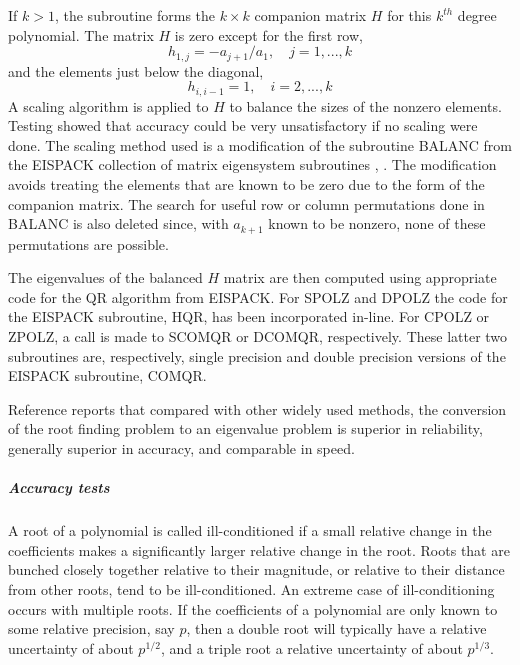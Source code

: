 \documentclass[twoside]{MATH77}
\begin{document}
If  $k>1$, the subroutine forms the $k\times k$ companion matrix $H$ for
this $k^{th}$ degree polynomial. The matrix $H$ is zero except for the first
row,%
\begin{equation*}
h_{1,j}=-a_{j+1}/a_1,\quad j=1, ..., k
\end{equation*}
and the elements just below the diagonal,%
\begin{equation*}
h_{i,i-1}=1,\quad i=2, ..., k
\end{equation*}
A scaling algorithm is applied to $H$ to balance the sizes of the nonzero
elements.  Testing showed that accuracy could be very unsatisfactory if no
scaling were done.  The scaling method used is a modification of the
subroutine BALANC from the EISPACK collection of matrix eigensystem
subroutines \cite{Smith:1974:MER}, \cite{Garbow:1977:MER}.  The
modification avoids treating the elements that are known to be zero due to
the form of the companion matrix.  The search for useful row or column
permutations done in BALANC is also deleted since, with $a_{k+1}$ known to
be nonzero, none of these permutations are possible.

The eigenvalues of the balanced $H$ matrix are then computed using appropriate
code for the QR algorithm from EISPACK. For SPOLZ and DPOLZ the code for the
EISPACK subroutine, HQR, has been incorporated in-line. For CPOLZ or ZPOLZ,
a call is made to SCOMQR or DCOMQR, respectively. These latter two
subroutines are, respectively, single precision and double precision versions
of the EISPACK subroutine, COMQR.

Reference \cite{Goedecker:1994:RAF} reports that compared with other
widely used methods, the conversion of the root finding problem to an
eigenvalue problem is superior in reliability, generally superior in
accuracy, and comparable in speed.

\subparagraph{Accuracy tests}

A root of a polynomial is called ill-conditioned if a small relative change
in the coefficients makes a significantly larger relative change in the
root. Roots that are bunched closely together relative to their magnitude,
or relative to their distance from other roots, tend to be ill-conditioned.
An extreme case of ill-conditioning occurs with multiple roots. If the
coefficients of a polynomial are only known to some relative precision, say $%
p$, then a double root will typically have a relative uncertainty of about $%
p^{1/2}$, and a triple root a relative uncertainty of about $p^{1/3}.$
\end{document}
